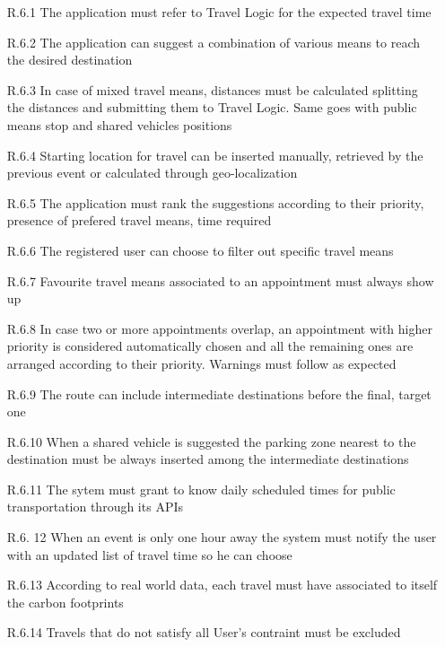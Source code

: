 \begin{itemize}
                  \begin{itemize}
                        \item [R.6.1] The application must refer to Travel Logic for the expected travel time 
                        \item [R.6.2] The application can suggest a combination of various means to reach the desired destination
                        \item [R.6.3] In case of mixed travel means, distances must be calculated splitting the distances and submitting them to Travel Logic. Same goes with public means stop and shared vehicles positions
                        \item [R.6.4] Starting location for travel can be inserted manually, retrieved by the previous event or calculated through geo-localization
                        \item [R.6.5] The application must rank the suggestions according to their priority, presence of prefered travel means, time required
                        \item [R.6.6] The registered user can choose to filter out specific travel means
                        \item [R.6.7] Favourite travel means associated to an appointment must always show up
                        \item [R.6.8] In case two or more appointments overlap, an appointment with higher priority is considered automatically chosen and all the remaining ones are arranged according to their priority. Warnings must follow as expected
                        \item [R.6.9] The route can include intermediate destinations before the final, target one 
                        \item [R.6.10] When a shared vehicle is suggested the parking zone nearest to the destination must be always inserted among the intermediate destinations 
                        \item [R.6.11] The sytem must grant to know daily scheduled times for public transportation through its APIs
                        \item [R.6.	12] When an event is only one hour away the system must notify the user with an updated list of travel time so he can choose
                        \item [R.6.13] According to real world data, each travel must have associated to itself the carbon footprints
                       	\item [R.6.14] Travels that do not satisfy all User's contraint must be excluded
                        

\end{itemize}
\end{itemize}
